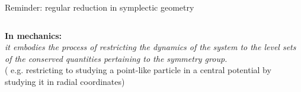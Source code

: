 \documentclass[beamer,10pt,handout]{standalone}  \Handouttrue
\begin{document}
\begin{frame}{Reminder: regular reduction in symplectic geometry}
\begin{columns}
		\begin{column}{0.6\textwidth}
				\textbf{\color{UniGreen}In mechanics:}~~
				\\
			{\it \small
				it embodies the process of restricting the dynamics of the system to the level sets of the conserved quantities pertaining to the symmetry group.		
			}
			\\[.2em]
			\color{gray}\small( e.g. restricting to studying a point-like particle in a central potential by studying it in radial coordinates)
		\end{column}	
	\end{columns}	
\end{frame}
\note[itemize]{
	\item
}
\end{document}
